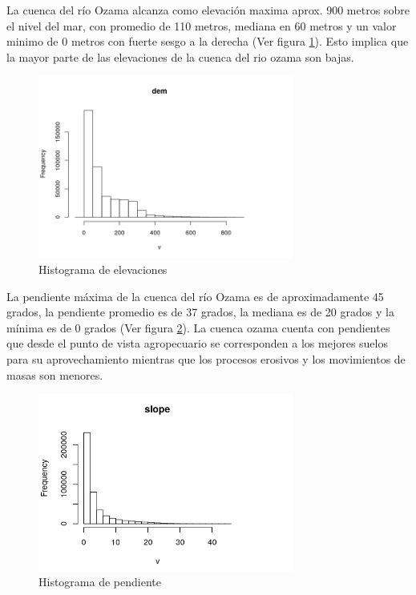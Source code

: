 \documentclass[11pt,]{article}
\begin{document}
La cuenca del río Ozama alcanza como elevación maxima aprox. 900 metros
sobre el nivel del mar, con promedio de 110 metros, mediana en 60 metros
y un valor minimo de 0 metros con fuerte sesgo a la derecha (Ver figura
\ref{fig:hist1}). Esto implica que la mayor parte de las elevaciones de
la cuenca del rio ozama son bajas.

\begin{figure}
\centering
\includegraphics[width=0.75000\textwidth]{Productos Generados/Histograma-de-elevaciones.png}
\caption{\label{fig:hist1}Histograma de elevaciones}
\end{figure}

La pendiente máxima de la cuenca del río Ozama es de aproximadamente 45
grados, la pendiente promedio es de 37 grados, la mediana es de 20
grados y la mínima es de 0 grados (Ver figura \ref{fig:hist2}). La
cuenca ozama cuenta con pendientes que desde el punto de vista
agropecuario se corresponden a los mejores suelos para su
aprovechamiento mientras que los procesos erosivos y los movimientos de
masas son menores.

\begin{figure}
\centering
\includegraphics[width=0.75000\textwidth]{Productos Generados/slope.jpeg}
\caption{\label{fig:hist2}Histograma de pendiente}
\end{figure}
\end{document}
